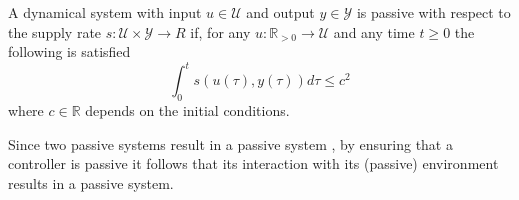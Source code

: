 \begin{definition}
  A dynamical system with input $ u \in \mathcal{U}$ and output $y \in \mathcal{Y}$ is passive with respect to the supply rate $s : \mathcal{U} \times \mathcal{Y} \rightarrow{R}$ if, for any $u: \mathbb{R}_{>0} \rightarrow \mathcal{U}$ and any time $t \geq 0$ the following is satisfied
  \begin{equation}
    \int_0^t s \left( u(\tau),  y (\tau) \right) d \tau \leq c^2
  \end{equation}
  where $c \in \mathbb{R}$ depends on the initial conditions.
\end{definition}

Since two passive systems result in a passive system \cite{sepulchre2012constructive}, by ensuring that a controller is passive it follows that its interaction with its (passive) environment results in a passive system.

